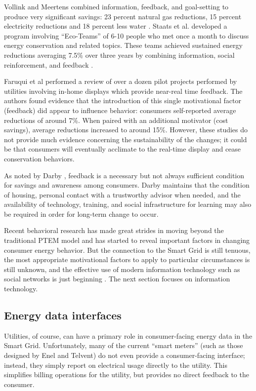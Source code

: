 Vollink and Meertens combined information, feedback, and goal-setting to
produce very significant savings: 23 percent natural gas reductions, 15
percent electricity reductions and 18 percent less water \cite{Vollink99}.
Staats et al. developed a program involving ``Eco-Teams'' of 6-10 people
who met once a month to discuss energy conservation and related
topics. These teams achieved sustained energy reductions averaging 7.5\% over
three years by combining information, social reinforcement, and feedback
\cite{Staats04}.

Faruqui et al \cite{Faruqui09} performed a review of over a dozen pilot projects
performed by utilities involving in-home displays which provide near-real
time feedback.  The authors found evidence that the introduction of this
single motivational factor (feedback) did appear to influence behavior:
consumers self-reported average reductions of around 7\%.   When paired with an
additional motivator (cost savings), average reductions increased to around
15\%.  However, these studies do not provide much evidence concerning the
sustainability of the changes; it could be that consumers will eventually
acclimate to the real-time display and cease conservation behaviors. 

As noted by Darby \cite{Darby06}, feedback is a necessary but
not always sufficient condition for savings and awareness among
consumers. Darby maintains that  the condition of housing, personal contact
with a trustworthy advisor when needed, and the availability of technology, 
training, and social infrastructure for learning may also be required 
in order for long-term change to occur.  

Recent behavioral research has made great strides in moving beyond the
traditional PTEM model and has started to reveal important factors in
changing consumer energy behavior. But the connection to the Smart Grid is
still tenuous, the most appropriate motivational factors to apply to
particular circumstances is still unknown, and the effective use of modern
information technology such as social networks is just beginning
\cite{StepGreen}.  The next section focuses on information technology.

\subsection{Energy data interfaces}

Utilities, of course, can have a primary role in consumer-facing energy
data in the Smart Grid. Unfortunately, many of the current ``smart meters''
(such as those designed by Enel and Telvent) do not even provide a
consumer-facing interface; instead, they simply report on electrical usage
directly to the utility.  This simplifies billing operations for the
utility, but provides no direct feedback to the consumer.

